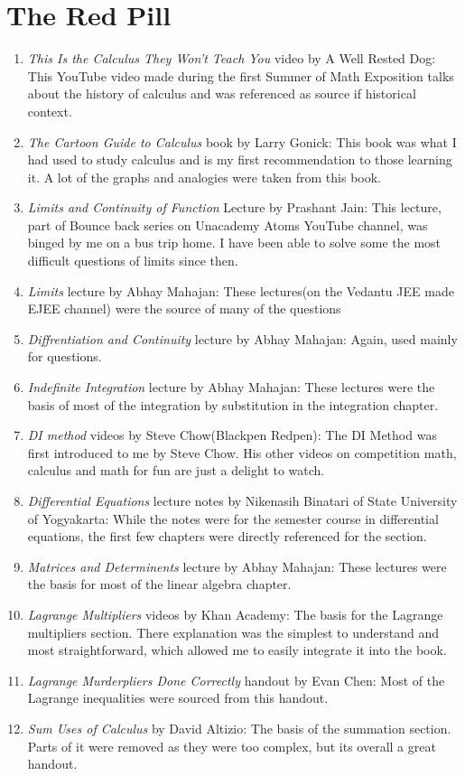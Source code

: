 \section{The Red Pill}
\begin{enumerate}
    \item \emph{This Is the Calculus They Won't Teach You} video by A Well Rested Dog: This YouTube video made during the first Summer of Math Exposition talks about the history of calculus and was referenced as source if historical context.
    \item \emph{The Cartoon Guide to Calculus} book by Larry Gonick: This book was what I had used to study calculus and is my first recommendation to those learning it. A lot of the graphs and analogies were taken from this book.\\
    \item \emph{Limits and Continuity of Function} Lecture by Prashant Jain: This lecture, part of Bounce back series on Unacademy Atoms YouTube channel, was binged by me on a bus trip home. I have been able to solve some the most difficult questions of limits since then.
    \item \emph{Limits} lecture by Abhay Mahajan: These lectures(on the Vedantu JEE made EJEE channel) were the source of many of the questions\\
    \item \emph{Diffrentiation and Continuity} lecture by Abhay Mahajan: Again, used mainly for questions.
    \item \emph{Indefinite Integration} lecture by Abhay Mahajan: These lectures were the basis of most of the integration by substitution in the integration chapter. 
    \item \emph{DI method} videos by Steve Chow(Blackpen Redpen): The DI Method was first introduced to me by Steve Chow. His other videos on competition math, calculus and math for fun are just a delight to watch.
    \item \emph{Differential Equations} lecture notes by Nikenasih Binatari of State University of Yogyakarta: While the notes were for the semester course in differential equations, the first few chapters were directly referenced for the section.
    \item  \emph{Matrices and Determinents} lecture by Abhay Mahajan: These lectures were the basis for most of the linear algebra chapter.
    \item \emph{Lagrange Multipliers} videos by Khan Academy: The basis for the Lagrange multipliers section. There explanation was the simplest to understand and most straightforward, which allowed me to easily integrate it into the book.
    \item \emph{Lagrange Murderpliers Done Correctly} handout by Evan Chen: Most of the Lagrange inequalities were sourced from this handout.
    \item \emph{Sum Uses of Calculus} by David Altizio: The basis of the summation section. Parts of it were removed as they were too complex, but its overall a great handout.
\end{enumerate}
